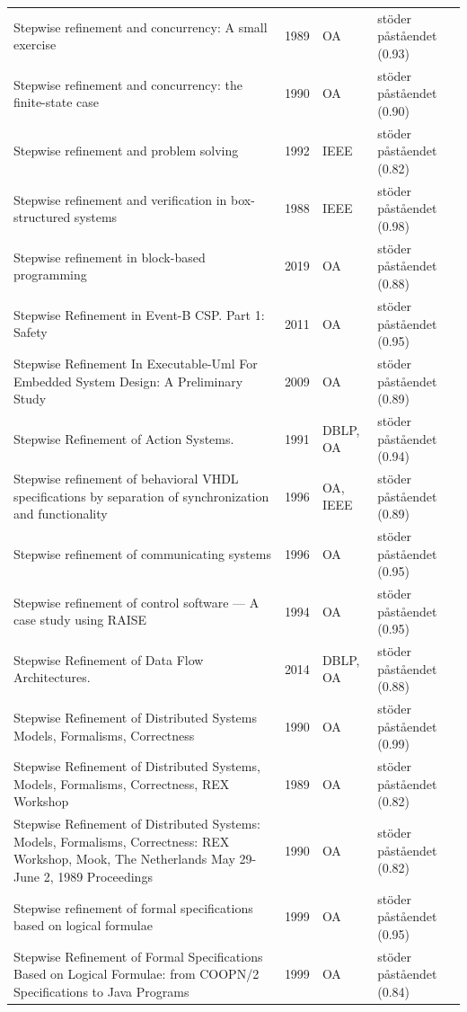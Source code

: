 \begin{longtable}{@{}%
  >{\raggedright\arraybackslash}p{}c%
  >{\raggedright\arraybackslash}p{}%
  >{\raggedright\arraybackslash}p{}@{}}
Stepwise refinement and concurrency: A small exercise & 1989 & OA & stöder påståendet (0.93) \\
Stepwise refinement and concurrency: the finite-state case & 1990 & OA & stöder påståendet (0.90) \\
Stepwise refinement and problem solving & 1992 & IEEE & stöder påståendet (0.82) \\
Stepwise refinement and verification in box-structured systems & 1988 & IEEE & stöder påståendet (0.98) \\
Stepwise refinement in block-based programming & 2019 & OA & stöder påståendet (0.88) \\
Stepwise Refinement in Event-B CSP. Part 1: Safety & 2011 & OA & stöder påståendet (0.95) \\
Stepwise Refinement In Executable-Uml For Embedded System Design: A Preliminary Study & 2009 & OA & stöder påståendet (0.89) \\
Stepwise Refinement of Action Systems. & 1991 & DBLP, OA & stöder påståendet (0.94) \\
Stepwise refinement of behavioral VHDL specifications by separation of synchronization and functionality & 1996 & OA, IEEE & stöder påståendet (0.89) \\
Stepwise refinement of communicating systems & 1996 & OA & stöder påståendet (0.95) \\
Stepwise refinement of control software --- A case study using RAISE & 1994 & OA & stöder påståendet (0.95) \\
Stepwise Refinement of Data Flow Architectures. & 2014 & DBLP, OA & stöder påståendet (0.88) \\
Stepwise Refinement of Distributed Systems Models, Formalisms, Correctness & 1990 & OA & stöder påståendet (0.99) \\
Stepwise Refinement of Distributed Systems, Models, Formalisms, Correctness, REX Workshop & 1989 & OA & stöder påståendet (0.82) \\
Stepwise Refinement of Distributed Systems: Models, Formalisms, Correctness: REX Workshop, Mook, The Netherlands May 29- June 2, 1989 Proceedings & 1990 & OA & stöder påståendet (0.82) \\
Stepwise refinement of formal specifications based on logical formulae & 1999 & OA & stöder påståendet (0.95) \\
Stepwise Refinement of Formal Specifications Based on Logical Formulae: from COOPN/2 Specifications to Java Programs & 1999 & OA & stöder påståendet (0.84) \\

\end{longtable}
